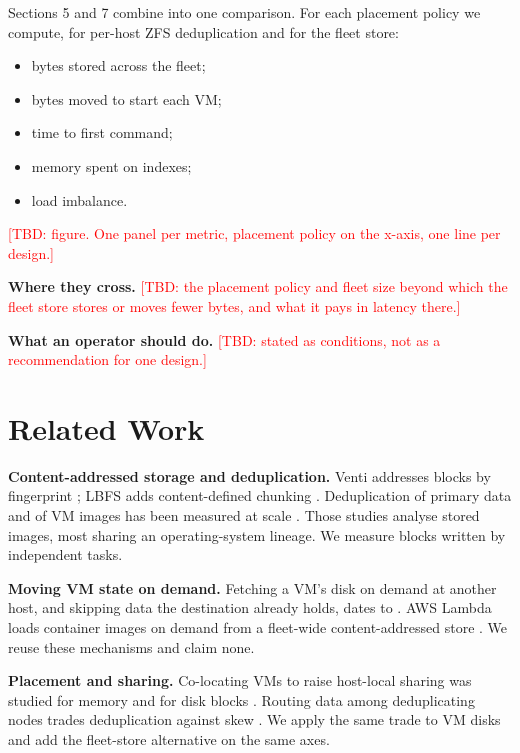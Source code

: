 \documentclass[10pt,twocolumn]{article}
\newcommand{\TBD}[1]{\textcolor{red}{[TBD: #1]}}
\begin{document}
Sections 5 and 7 combine into one comparison. For each placement policy we compute, for per-host ZFS deduplication and for the fleet store:

\begin{itemize}
\item bytes stored across the fleet;

\item bytes moved to start each VM;

\item time to first command;

\item memory spent on indexes;

\item load imbalance.

\end{itemize}

\TBD{figure. One panel per metric, placement policy on the x-axis, one line per design.}

\textbf{Where they cross.} \TBD{the placement policy and fleet size beyond which the fleet store stores or moves fewer bytes, and what it pays in latency there.}

\textbf{What an operator should do.} \TBD{stated as conditions, not as a recommendation for one design.}

\section{Related Work}

\textbf{Content-addressed storage and deduplication.} Venti addresses blocks by fingerprint \cite{venti}; LBFS adds content-defined chunking \cite{lbfs}. Deduplication of primary data and of VM images has been measured at scale \cite{meyer,elshimi,jin-miller,jayaram}. Those studies analyse stored images, most sharing an operating-system lineage. We measure blocks written by independent tasks.

\textbf{Moving VM state on demand.} Fetching a VM's disk on demand at another host, and skipping data the destination already holds, dates to \cite{sapuntzakis,isr,snowflock}. AWS Lambda loads container images on demand from a fleet-wide content-addressed store \cite{lambda}. We reuse these mechanisms and claim none.

\textbf{Placement and sharing.} Co-locating VMs to raise host-local sharing was studied for memory \cite{memory-buddies,sindelar} and for disk blocks \cite{smio}. Routing data among deduplicating nodes trades deduplication against skew \cite{dong}. We apply the same trade to VM disks and add the fleet-store alternative on the same axes.
\end{document}
